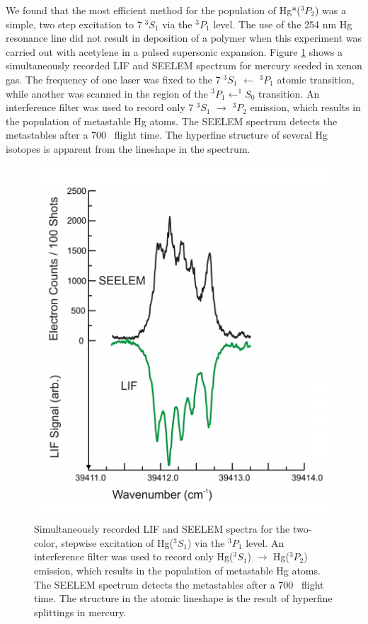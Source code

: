 \documentclass[12pt]{mitthesis}
\begin{document}
We found that the most efficient method for the population of
Hg*($^3P_2$) was a simple, two step excitation to $7 \; ^3S_1$ via the
$^3P_1$ level.  The use of the 254 nm Hg resonance line did not result
in deposition of a polymer when this experiment was carried out with
acetylene in a pulsed supersonic expansion.  Figure
\ref{fig:hg-twostep} shows a simultaneously recorded LIF and SEELEM
spectrum for mercury seeded in xenon gas.  The frequency of one laser
was fixed to the $7 \; ^3S_1$ $\leftarrow$ $^3P_1$ atomic transition,
while another was scanned in the region of the $^3P_1 \leftarrow
^1S_0$ transition.  An interference filter was used to record only $7
\; ^3S_1$ $\rightarrow$ $^3P_2$ emission, which results in the
population of metastable Hg atoms.  The SEELEM spectrum detects the
metastables after a 700 \microsec\ flight time.  The hyperfine
structure of several Hg isotopes is apparent from the lineshape in the
spectrum.

\begin{figure}
  \caption{Simultaneously recorded LIF and SEELEM spectra for the
    two-color, stepwise excitation of Hg($^3S_1$) via the $^3P_1$
    level.  An interference filter was used to record only Hg($^3S_1$)
    $\rightarrow$ Hg($^3P_2$) emission, which results in the
    population of metastable Hg atoms.  The SEELEM spectrum detects
    the metastables after a 700 \microsec\ flight time.  The structure
    in the atomic lineshape is the result of hyperfine splittings in
    mercury.}
  \label{fig:hg-twostep}
  \centering
  \includegraphics[width=6.5in]{hg-twostep.pdf}
\end{figure}
\end{document}
